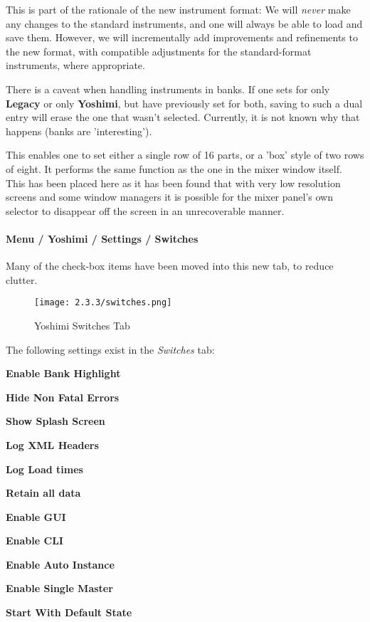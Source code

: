    This is part of the rationale of the new instrument format: We will
   \textsl{never} make any changes to the standard instruments, and one will always
   be able to load and save them. However, we will incrementally add improvements
   and refinements to the new format, with compatible
   adjustments for the standard-format instruments, where appropriate.

   There is a caveat when handling instruments in banks. If one sets for
   only \textbf{Legacy} or only \textbf{Yoshimi}, but have previously set
   for both, saving to such a dual entry will erase the one that wasn't
   selected. Currently, it is not known why that happens (banks are
   'interesting').

   This enables one to set either a single row of 16 parts, or a 'box'
   style of two rows of eight. It performs the same function as the one
   in the mixer window itself. This has been placed here as it has been
   found that with very low resolution screens and some window managers
   it is possible for the mixer panel's own selector to disappear off the
   screen in an unrecoverable manner.

\paragraph{Menu / Yoshimi / Settings / Switches}
\label{paragraph:menu_yoshimi_settings_switches}

   Many of the check-box items have been moved into this new tab, to reduce
   clutter.

\begin{figure}[H]
   \centering
   \texttt{[image: 2.3.3/switches.png]}
   \caption{Yoshimi Switches Tab}
   \label{fig:yoshimi_settings_switches_tab}
\end{figure}

   The following settings exist in the \textsl{Switches} tab:

   \begin{enumber}
      \item \textbf{Enable Bank Highlight}
      \item \textbf{Hide Non Fatal Errors}
      \item \textbf{Show Splash Screen}
      \item \textbf{Log XML Headers}
      \item \textbf{Log Load times}
      \item \textbf{Retain all data}
      \item \textbf{Enable GUI}
      \item \textbf{Enable CLI}
      \item \textbf{Enable Auto Instance}
      \item \textbf{Enable Single Master}
      \item \textbf{Start With Default State}
   \end{enumber}

